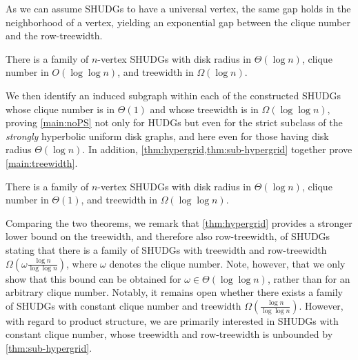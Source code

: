 As we can assume SHUDGs to have a universal vertex, the same gap holds in the neighborhood of a vertex, yielding an exponential gap between the clique number and the row-treewidth.
%
%
\begin{theorem}\label{thm:hypergrid}
    There is a family of $ n $-vertex SHUDGs with disk radius in $\Theta(\log n)$, clique number
    in $O(\log \log n)$, and treewidth in $\Omega(\log n)$.
\end{theorem}
%
We then identify an induced subgraph within each of the constructed SHUDGs whose clique number is in $\Theta(1)$ and whose
treewidth is in $\Omega(\log \log n)$, proving \cref{main:noPS} not only for HUDGs but even for the strict subclass of the \emph{strongly} hyperbolic uniform disk graphs, and here even for those having disk radius $ \Theta(\log n)$.
In addition, \cref{thm:hypergrid,thm:sub-hypergrid} together prove \cref{main:treewidth}.
%
\begin{theorem}\label{thm:sub-hypergrid}
    There is a family of $ n $-vertex SHUDGs with disk radius in $\Theta(\log n)$, clique number in $\Theta(1)$,
    and treewidth in $\Omega(\log \log n)$.
\end{theorem}
%
Comparing the two theorems, we remark that \cref{thm:hypergrid} provides a stronger lower bound on the treewidth, and therefore also row-treewidth, of SHUDGs stating that there is a family of SHUDGs
with treewidth and row-treewidth $\Omega (\omega \frac{\log n}{\log \log n} )$, where $\omega$ denotes the clique number.
Note, however, that we only show that this bound can be obtained for $\omega \in \Theta(\log \log n)$, rather than for an
arbitrary clique number.
Notably, it remains open whether there exists a family of SHUDGs with constant clique number and treewidth $\Omega ( \frac{\log n}{\log \log n} )$.
However, with regard to product structure, we are primarily interested in SHUDGs with constant clique number, whose treewidth and row-treewidth is unbounded by \cref{thm:sub-hypergrid}.
